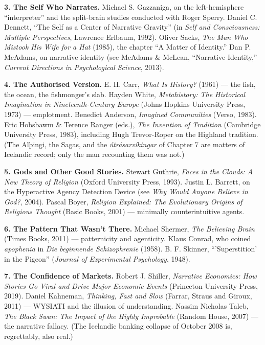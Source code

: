 \textbf{3. The Self Who Narrates.} Michael S. Gazzaniga, on the left-hemisphere ``interpreter'' and the split-brain studies conducted with Roger Sperry. Daniel C. Dennett, ``The Self as a Center of Narrative Gravity'' (in \emph{Self and Consciousness: Multiple Perspectives}, Lawrence Erlbaum, 1992). Oliver Sacks, \emph{The Man Who Mistook His Wife for a Hat} (1985), the chapter ``A Matter of Identity.'' Dan P. McAdams, on narrative identity (see McAdams \& McLean, ``Narrative Identity,'' \emph{Current Directions in Psychological Science}, 2013).

\textbf{4. The Authorised Version.} E. H. Carr, \emph{What Is History?} (1961) — the fish, the ocean, the fishmonger's slab. Hayden White, \emph{Metahistory: The Historical Imagination in Nineteenth-Century Europe} (Johns Hopkins University Press, 1973) — emplotment. Benedict Anderson, \emph{Imagined Communities} (Verso, 1983). Eric Hobsbawm \& Terence Ranger (eds.), \emph{The Invention of Tradition} (Cambridge University Press, 1983), including Hugh Trevor-Roper on the Highland tradition. (The Alþingi, the Sagas, and the \emph{útrásarvíkingar} of Chapter 7 are matters of Icelandic record; only the man recounting them was not.)

\textbf{5. Gods and Other Good Stories.} Stewart Guthrie, \emph{Faces in the Clouds: A New Theory of Religion} (Oxford University Press, 1993). Justin L. Barrett, on the Hyperactive Agency Detection Device (see \emph{Why Would Anyone Believe in God?}, 2004). Pascal Boyer, \emph{Religion Explained: The Evolutionary Origins of Religious Thought} (Basic Books, 2001) — minimally counterintuitive agents.

\textbf{6. The Pattern That Wasn't There.} Michael Shermer, \emph{The Believing Brain} (Times Books, 2011) — patternicity and agenticity. Klaus Conrad, who coined \emph{apophenia} in \emph{Die beginnende Schizophrenie} (1958). B. F. Skinner, ``'Superstition' in the Pigeon'' (\emph{Journal of Experimental Psychology}, 1948).

\textbf{7. The Confidence of Markets.} Robert J. Shiller, \emph{Narrative Economics: How Stories Go Viral and Drive Major Economic Events} (Princeton University Press, 2019). Daniel Kahneman, \emph{Thinking, Fast and Slow} (Farrar, Straus and Giroux, 2011) — WYSIATI and the illusion of understanding. Nassim Nicholas Taleb, \emph{The Black Swan: The Impact of the Highly Improbable} (Random House, 2007) — the narrative fallacy. (The Icelandic banking collapse of October 2008 is, regrettably, also real.)

